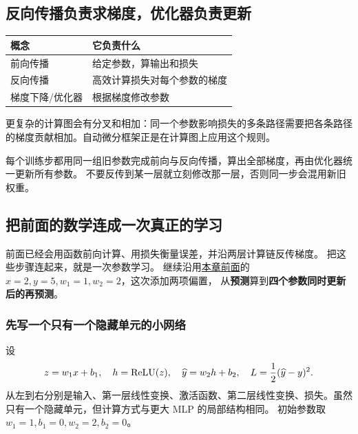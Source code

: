 \subsection{反向传播负责求梯度，优化器负责更新}

\begin{center}
\begin{tabularx}{\linewidth}{@{}p{29mm}X@{}}\toprule
概念 & 它负责什么\\\midrule
前向传播 & 给定参数，算输出和损失\\
反向传播 & 高效计算损失对每个参数的梯度\\
梯度下降/优化器 & 根据梯度修改参数\\
\bottomrule\end{tabularx}
\end{center}

更复杂的计算图会有分叉和相加：同一个参数影响损失的多条路径需要把各条路径的梯度贡献相加。自动微分框架正是在计算图上应用这个规则。

\begin{warningbox}
每个训练步都用同一组旧参数完成前向与反向传播，算出全部梯度，再由优化器统一更新所有参数。
不要反传到某一层就立刻修改那一层，否则同一步会混用新旧权重。
\end{warningbox}

\subsection{把前面的数学连成一次真正的学习}
\label{sec:end-to-end-step}

前面已经会用函数前向计算、用损失衡量误差，并沿两层计算链反传梯度。
把这些步骤连起来，就是一次参数学习。
继续沿用\hyperref[sec:backprop-weight-gradients]{本章前面}的 $x=2,y=5,w_1=1,w_2=2$，这次添加两项偏置，
从\textbf{预测}算到\textbf{四个参数同时更新后的再预测}。

\subsubsection{先写一个只有一个隐藏单元的小网络}

设
\begin{equation}
z=w_1x+b_1,\quad h=\operatorname{ReLU}(z),\quad
\widehat{y}=w_2h+b_2,\quad
L=\frac12(\widehat{y}-y)^2.
\label{eq:small-network-full}
\end{equation}
从左到右分别是输入、第一层线性变换、激活函数、第二层线性变换、损失。虽然只有一个隐藏单元，但计算方式与更大 MLP 的局部结构相同。
初始参数取 $w_1=1,b_1=0,w_2=2,b_2=0$。

